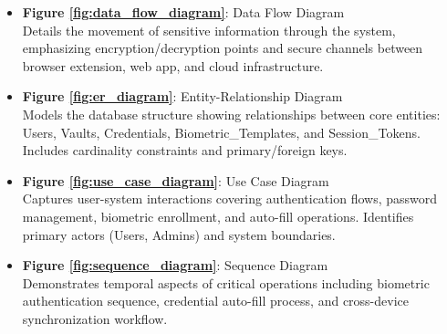 \documentclass{scrreprt}
\begin{document}
\begin{itemize}


    \item \textbf{Figure \ref{fig:data_flow_diagram}}: Data Flow Diagram \\
    Details the movement of sensitive information through the system, emphasizing encryption/decryption points and secure channels between browser extension, web app, and cloud infrastructure.

    \item \textbf{Figure \ref{fig:er_diagram}}: Entity-Relationship Diagram \\
    Models the database structure showing relationships between core entities: Users, Vaults, Credentials, Biometric\_Templates, and Session\_Tokens. Includes cardinality constraints and primary/foreign keys.

    \item \textbf{Figure \ref{fig:use_case_diagram}}: Use Case Diagram \\
    Captures user-system interactions covering authentication flows, password management, biometric enrollment, and auto-fill operations. Identifies primary actors (Users, Admins) and system boundaries.

    \item \textbf{Figure \ref{fig:sequence_diagram}}: Sequence Diagram \\
    Demonstrates temporal aspects of critical operations including biometric authentication sequence, credential auto-fill process, and cross-device synchronization workflow.
    
\end{itemize}
\end{document}
